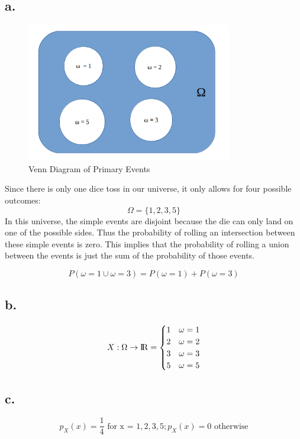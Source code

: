 \documentclass[10pt, letterpaper]{paper}
\begin{document}
\subsection*{a.}
\begin{figure}[h!]
\centering
\includegraphics[width=0.8\textwidth]{VennDiagram.png}
\caption{ Venn Diagram of Primary Events }
\end{figure}

Since there is only one dice toss in our universe, it only allows for four possible outcomes: 
$$\Omega = \{1,2,3,5\}$$ In this universe, the simple events are disjoint because the die can only land on one of the possible sides. Thus the probability of rolling an intersection between these simple events is zero. This implies that the probability of rolling a union between the events is just the sum of the probability of those events.

$$P( \omega = 1 \cup \omega = 3 ) = P( \omega = 1 ) + P( \omega = 3 )$$

\subsection*{b.}
$$X:\Omega \rightarrow {\rm I\!R} = 
\begin{cases} 
      1 & \omega = 1 \\
      2 & \omega = 2 \\
      3 & \omega = 3 \\
      5 & \omega = 5
   \end{cases}$$

\subsection*{c.}
$$p_X (x) = \frac{1}{4} \text{ for x = } 1,2,3,5 ; p_X (x) = 0 \text{ otherwise}$$
\end{document}
